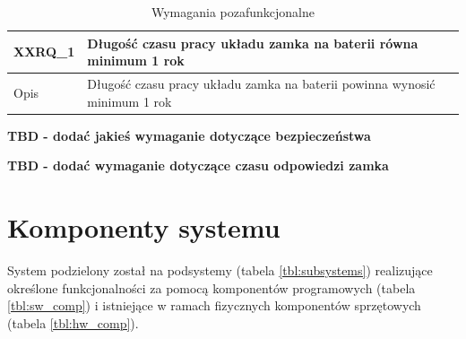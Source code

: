         \begin{table}[h!]
            \caption{Wymagania pozafunkcjonalne}
            \centering
            \begin{subtable}[c]{\textwidth}
                \centering
                \begin{tabular}{|p{2cm}|p{12cm}|}
                    \hline XXRQ\_1      & \textbf{Długość czasu pracy układu zamka na baterii równa minimum 1 rok}  \\
                    \hline \cellcolor[gray]{0.8} Opis         & Długość czasu pracy układu zamka na baterii powinna wynosić minimum 1 rok \\
                    \hline
                \end{tabular}
                \label{tbl:xxrq1}    
            \end{subtable}
            \label{tbl:xxrq}
        \end{table}

        \textbf{TBD - dodać jakieś wymaganie dotyczące bezpieczeństwa}

        \textbf{TBD - dodać wymaganie dotyczące czasu odpowiedzi zamka}

        \section{Komponenty systemu}

            System podzielony został na podsystemy (tabela \ref{tbl:subsystems}) realizujące określone funkcjonalności za pomocą komponentów programowych (tabela \ref{tbl:sw_comp}) i istniejące w ramach fizycznych komponentów sprzętowych (tabela \ref{tbl:hw_comp}).

